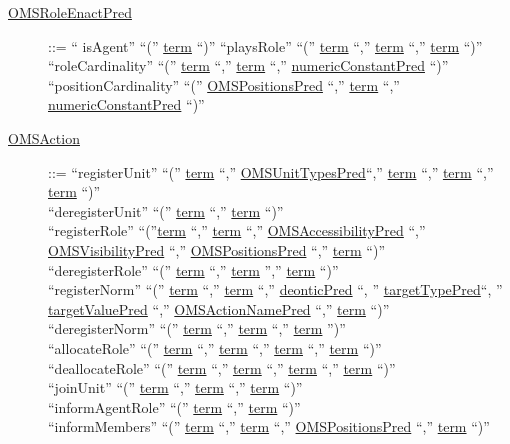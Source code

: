 \begin{description}
\item[\underline{OMSRoleEnactPred}] ::= `` isAgent'' ``('' \underline{term} ``)'' \textbar 
		``playsRole'' ``('' \underline{term} ``,'' \underline{term} ``,'' \underline{term} ``)'' \textbar
		``roleCardinality'' ``('' \underline{term} ``,'' \underline{term} ``,'' \underline{numericConstantPred} ``)'' \textbar 
		``positionCardinality'' ``('' \underline{OMSPositionsPred} ``,'' \underline{term} ``,'' \underline{numericConstantPred} ``)'' 




\item[\underline{OMSAction}] ::= ``registerUnit'' ``('' \underline{term} ``,'' \underline{OMSUnitTypesPred}``,'' \underline{term} ``,'' \underline{term} ``,'' \underline{term} ``)'' \textbar\\
 		``deregisterUnit'' ``('' \underline{term} ``,'' \underline{term} ``)'' \textbar \\
		``registerRole'' ``(''\underline{term} ``,'' \underline{term} ``,'' \underline{OMSAccessibilityPred} ``,'' \underline{OMSVisibilityPred} ``,'' \underline{OMSPositionsPred} ``,'' \underline{term} ``)'' \textbar \\
		``deregisterRole'' ``('' \underline{term} ``,'' \underline{term} '','' \underline{term} ``)'' \textbar\\
		``registerNorm'' ``('' \underline{term} ``,'' \underline{term} ``,'' \underline{deonticPred} ``, '' \underline{targetTypePred}``, '' \underline{targetValuePred} ``,'' \underline{OMSActionNamePred} ``,'' \underline{term} ``)'' \textbar\\
		``deregisterNorm'' ``('' \underline{term} ``,'' \underline{term} ``,'' \underline{term} '')'' \textbar \\
		``allocateRole'' ``('' \underline{term} ``,'' \underline{term} ``,'' \underline{term} ``,'' \underline{term} ``)'' \textbar \\
		``deallocateRole'' ``('' \underline{term} ``,'' \underline{term} ``,'' \underline{term} ``,'' \underline{term} ``)'' \textbar \\
		``joinUnit'' ``('' \underline{term} ``,'' \underline{term} ``,'' \underline{term} ``)'' \textbar \\
		``informAgentRole'' ``('' \underline{term} ``,'' \underline{term} ``)'' \textbar \\
		``informMembers'' ``('' \underline{term} ``,'' \underline{term} ``,'' \underline{OMSPositionsPred} ``,'' \underline{term} ``)'' \textbar\\

\end{description}

